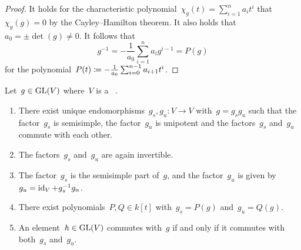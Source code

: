 \begin{proof}
  It holds for the characteristic polynomial~$\chi_g(t) = \sum_{i=1}^n a_i t^i$ that~$\chi_g(g) = 0$ by the Cayley\nobreakdash--Hamilton theorem.
  It also holds that~$a_0 = \pm \det(g) \neq 0$.
  It follows that
  \[
      g^{-1}
    = -\frac{1}{a_0} \sum_{i=1}^n a_i g^{i-1}
    = P(g)
  \]
  for the polynomial~$P(t) \coloneqq -\frac{1}{a_0} \sum_{i=0}^{n-1} a_{i+1} t^i$.
\end{proof}


\begin{proposition}
  \label{mjcd}
  Let~$g \in \operatorname{GL}(V)$ where~$V$ is a ~.
  \begin{enumerate}
    \item
      \label{the mjcd itself}
      There exist unique endomorphisms~$g_s, g_u \colon V \to V$ with~$g = g_s g_u$ such that the factor~$g_s$ is semisimple, the factor~$g_u$ is unipotent and the factors~$g_s$ and~$g_u$ commute with each other.
    \item
      \label{ss and unipotent part invertible}
      The factors~$g_s$ and~$g_u$ are again invertible.
    \item
      \label{global description of mcjd}
      The factor~$g_s$ is the semisimple part of~$g$, and the factor~$g_u$ is given by~$g_u = \operatorname{id}_V + g_s^{-1} g_n$.
    \item
      \label{existence of polynomials for mjcd}
      There exist polynomials~$P, Q \in k[t]$ with~$g_s = P(g)$ and~$g_u = Q(g)$.
    \item
      \label{commuting via mjcd}
      An element~$h \in \operatorname{GL}(V)$ commutes with~$g$ if and only if it commutes with both~$g_s$ and~$g_u$.
  \end{enumerate}
\end{proposition}


